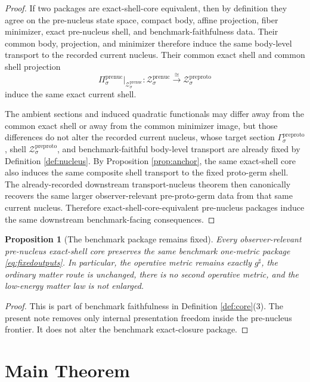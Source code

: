 \documentclass[11pt]{article}
\newcommand{\CompletedMetric}{g^{\sharp}}
\newcommand{\PreProtoSection}[1]{\Gamma_{#1}^{\mathrm{preproto}}}
\newcommand{\PreProtoShellSet}[1]{\mathcal Z_{#1}^{\mathrm{preproto}}}
\newcommand{\PreNucProj}[1]{\Pi_{#1}^{\mathrm{prenuc}}}
\newcommand{\PreNucShellSet}[1]{\mathcal Z_{#1}^{\mathrm{prenuc}}}
\newtheorem{proposition}{Proposition}
\begin{document}
\begin{proof}
If two packages are exact-shell-core equivalent, then by definition they agree on the pre-nucleus state space, compact body, affine projection, fiber minimizer, exact pre-nucleus shell, and benchmark-faithfulness data. Their common body, projection, and minimizer therefore induce the same body-level transport to the recorded current nucleus. Their common exact shell and common shell projection
\[
\PreNucProj{\sigma}\big|_{\PreNucShellSet{\sigma}}
:
\PreNucShellSet{\sigma}
\xrightarrow{\cong}
\PreProtoShellSet{\sigma}
\]
induce the same exact current shell.

The ambient sections and induced quadratic functionals may differ away from the common exact shell or away from the common minimizer image, but those differences do not alter the recorded current nucleus, whose target section \(\PreProtoSection{\sigma}\), shell \(\PreProtoShellSet{\sigma}\), and benchmark-faithful body-level transport are already fixed by Definition \ref{def:nucleus}. By Proposition \ref{prop:anchor}, the same exact-shell core also induces the same composite shell transport to the fixed proto-germ shell. The already-recorded downstream transport-nucleus theorem then canonically recovers the same larger observer-relevant pre-proto-germ data from that same current nucleus. Therefore exact-shell-core-equivalent pre-nucleus packages induce the same downstream benchmark-facing consequences.
\end{proof}

\begin{proposition}[The benchmark package remains fixed]
\label{prop:benchmark}
Every observer-relevant pre-nucleus exact-shell core preserves the same benchmark one-metric package \eqref{eq:fixedoutputs}. In particular, the operative metric remains exactly \(\CompletedMetric\), the ordinary matter route is unchanged, there is no second operative metric, and the low-energy matter law is not enlarged.
\end{proposition}

\begin{proof}
This is part of benchmark faithfulness in Definition \ref{def:core}(3). The present note removes only internal presentation freedom inside the pre-nucleus frontier. It does not alter the benchmark exact-closure package.
\end{proof}

\section{Main Theorem}
\end{document}
